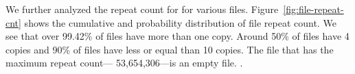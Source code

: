 %




We further analyzed the repeat count for for various files.
%
Figure~\ref{fig:file-repeat-cnt} shows the cumulative and probability
distribution of file repeat count.  
%
We see that over 99.42\% of files have more than one copy.
%
Around 50\% of files have 4 copies and 90\% of files have less or equal than 10
copies. 
%
The file that has the maximum repeat count--- 53,654,306---is an empty file.
%
.
